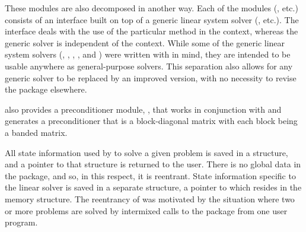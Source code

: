 These modules are also decomposed in another way.
Each of the modules ({\idadense}, etc.) consists of an interface built
on top of a generic linear system solver ({\dense}, etc.).  The
interface deals with the use of the particular method in the {\ida}
context, whereas the generic solver is independent of the context.
While some of the generic linear system solvers ({\dense}, {\band},
{\spgmr}, {\spbcg}, and {\sptfqmr}) were written with {\sundials} in
mind, they are intended to be usable anywhere as general-purpose
solvers.  This separation also allows for any generic solver to be
replaced by an improved version, with no necessity to revise the
{\ida} package elsewhere.

{\ida} also provides a preconditioner module, {\idabbdpre}, that works
in conjunction with {\nvecp} and generates a preconditioner that is a
block-diagonal matrix with each block being a banded matrix.

All state information used by {\ida} to solve a given problem is saved
in a structure, and a pointer to that structure is returned to the
user.  There is no global data in the {\ida} package, and so, in this
respect, it is reentrant. State information specific to the linear
solver is saved in a separate structure, a pointer to which resides in
the {\ida} memory structure. The reentrancy of {\ida} was motivated
by the situation where two or more problems are solved by
intermixed calls to the package from one user program.

